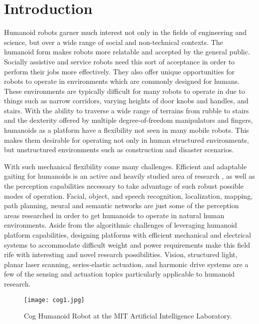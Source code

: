 \chapter{Introduction}

Humanoid robots garner much interest not only in the fields of engineering and science, but over a wide range of social and non-technical contexts. \cite{social1}\cite{comedy1}
The humanoid form makes robots more relatable and accepted by the general public. Socially assistive and service robots need this sort of acceptance in order to perform their jobs more effectively. \cite{social2}
They also offer unique opportunities for robots to operate in environments which are commonly designed for humans. These environments are typically difficult for many robots to operate in due to things such as narrow corridors, varying heights of door knobs and handles, and stairs.
With the ability to traverse a wide range of terrains from rubble to stairs and the dexterity offered by multiple degree-of-freedom manipulators and fingers, humanoids as a platform have a flexibility not seen in many mobile robots. This makes them desirable for operating not only in human structured environments, but unstructured environments such as construction and disaster scenarios. 
\cite{darpa1}

With such mechanical flexibility come many challenges. Efficient and adaptable gaiting for humanoids is an active and heavily studied area of research \cite{zmp_human1}\cite{naogait1}, as well as the perception capabilities necessary to take advantage of such robust possible modes of operation. Facial, object, and speech recognition, localization, mapping, path planning, neural and semantic networks are just some of the perception areas researched in order to get humanoids to operate in natural human environments.
\cite{icub_recog1}\cite{vslam1}\cite{path1}\cite{icub_net1}
Aside from the algorithmic challenges of leveraging humanoid platform capabilities, designing platforms with efficient mechanical and electrical systems to accommodate difficult weight and power requirements make this field rife with interesting and novel research possibilities. Vision, structured light, planar laser scanning, series-elastic actuation, and harmonic drive systems are a few of the sensing and actuation topics particularly applicable to humanoid research. \cite{pr2_1}\cite{sea1}

\begin{figure}[h]
	\centering
	\texttt{[image: cog1.jpg]}
	\caption[Cog Humanoid Robot.]
	{Cog Humanoid Robot at the MIT Artificial Intelligence Laboratory.}
	\label{fig:cog1}
\end{figure}

